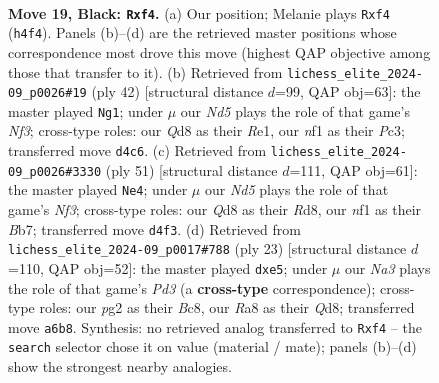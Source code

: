 \documentclass[11pt]{article}
\begin{document}
\begin{figure}[p]
\label{fig:thought-m35}
\end{figure}

\clearpage

\begin{figure}[p]\centering
\begin{subfigure}{0.46\textwidth}\centering
\resizebox{\linewidth}{!}{%
\newchessgame
\chessboard[
  setfen={r1bq1k2/pp3pp1/n3p3/3pP3/3n1P1r/PP1Q4/6PP/R3KNNR b KQ - 2 19},
  showmover=false,
  pgfstyle=straightmove, color=movearrow, markmove={h4-f4}
]}
\caption{}
\end{subfigure}\hfill
\begin{subfigure}{0.46\textwidth}\centering
\resizebox{\linewidth}{!}{%
\newchessgame
\chessboard[
  setfen={r5k1/bpp2p2/4rqnp/1P2p3/4P1p1/1QP2NB1/R4PPP/4R2K w - - 0 22},
  showmover=false,
  pgfstyle=straightmove, color=movearrow, markmove={f3-g1}
]}
\caption{}
\end{subfigure}
\\[4pt]
\begin{subfigure}{0.46\textwidth}\centering
\resizebox{\linewidth}{!}{%
\newchessgame
\chessboard[
  setfen={3r1k2/pb3pp1/1p3n1p/q2pP3/5QP1/2r2N1P/P4P2/1B1RR1K1 b - - 0 26},
  showmover=false,
  pgfstyle=straightmove, color=movearrow, markmove={f6-e4}
]}
\caption{}
\end{subfigure}\hfill
\begin{subfigure}{0.46\textwidth}\centering
\resizebox{\linewidth}{!}{%
\newchessgame
\chessboard[
  setfen={2bq3r/1p3kpp/1ppp1n2/r3P3/4P3/3P4/P1P3PP/R1BQK1NR b KQ - 0 12},
  showmover=false,
  pgfstyle=straightmove, color=movearrow, markmove={d6-e5}
]}
\caption{}
\end{subfigure}
\caption{\textbf{Move 19, Black: \texttt{Rxf4}.} (a) Our position; Melanie plays \texttt{Rxf4} (\texttt{h4f4}). Panels (b)--(d) are the retrieved master positions whose correspondence most drove this move (highest QAP objective among those that transfer to it). (b) Retrieved from \texttt{lichess\_elite\_2024-09\_p0026\#19} (ply 42) [structural distance $d$=99, QAP obj=63]: the master played \texttt{Ng1}; under $\mu$ our \emph{Nd5} plays the role of that game's \emph{Nf3}; cross-type roles: our \emph{Q}d8 as their \emph{R}e1, our \emph{n}f1 as their \emph{P}c3; transferred move \texttt{d4c6}. (c) Retrieved from \texttt{lichess\_elite\_2024-09\_p0026\#3330} (ply 51) [structural distance $d$=111, QAP obj=61]: the master played \texttt{Ne4}; under $\mu$ our \emph{Nd5} plays the role of that game's \emph{Nf3}; cross-type roles: our \emph{Q}d8 as their \emph{R}d8, our \emph{n}f1 as their \emph{B}b7; transferred move \texttt{d4f3}. (d) Retrieved from \texttt{lichess\_elite\_2024-09\_p0017\#788} (ply 23) [structural distance $d$=110, QAP obj=52]: the master played \texttt{dxe5}; under $\mu$ our \emph{Na3} plays the role of that game's \emph{Pd3} (a \textbf{cross-type} correspondence); cross-type roles: our \emph{p}g2 as their \emph{B}c8, our \emph{R}a8 as their \emph{Q}d8; transferred move \texttt{a6b8}. Synthesis: no retrieved analog transferred to \texttt{Rxf4} -- the \texttt{search} selector chose it on value (material / mate); panels (b)--(d) show the strongest nearby analogies.}
\label{fig:thought-m37}
\end{figure}
\end{document}
